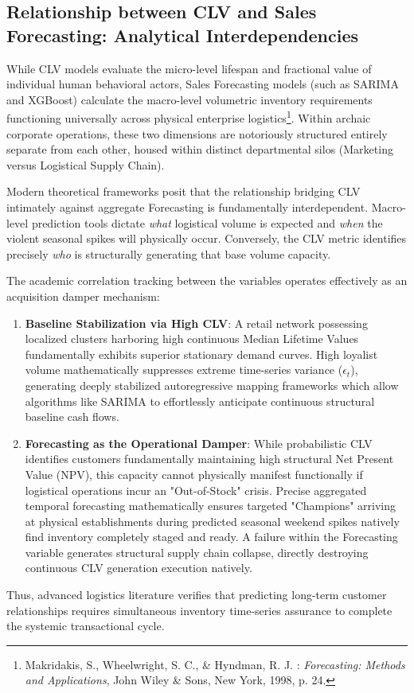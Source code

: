 \documentclass[12pt,a4paper]{report}
\begin{document}
\subsection{Relationship between CLV and Sales Forecasting: Analytical Interdependencies}
While CLV models evaluate the micro-level lifespan and fractional value of individual human behavioral actors, Sales Forecasting models (such as SARIMA and XGBoost) calculate the macro-level volumetric inventory requirements functioning universally across physical enterprise logistics\footnote{Makridakis, S., Wheelwright, S. C., \& Hyndman, R. J. : \textit{Forecasting: Methods and Applications}, John Wiley \& Sons, New York, 1998, p. 24.}. Within archaic corporate operations, these two dimensions are notoriously structured entirely separate from each other, housed within distinct departmental silos (Marketing versus Logistical Supply Chain).

Modern theoretical frameworks posit that the relationship bridging CLV intimately against aggregate Forecasting is fundamentally interdependent. Macro-level prediction tools dictate \textit{what} logistical volume is expected and \textit{when} the violent seasonal spikes will physically occur. Conversely, the CLV metric identifies precisely \textit{who} is structurally generating that base volume capacity. 

The academic correlation tracking between the variables operates effectively as an acquisition damper mechanism:
\begin{enumerate}
    \item \textbf{Baseline Stabilization via High CLV}: A retail network possessing localized clusters harboring high continuous Median Lifetime Values fundamentally exhibits superior stationary demand curves. High loyalist volume mathematically suppresses extreme time-series variance ($ \epsilon_t $), generating deeply stabilized autoregressive mapping frameworks which allow algorithms like SARIMA to effortlessly anticipate continuous structural baseline cash flows.
    \item \textbf{Forecasting as the Operational Damper}: While probabilistic CLV identifies customers fundamentally maintaining high structural Net Present Value (NPV), this capacity cannot physically manifest functionally if logistical operations incur an "Out-of-Stock" crisis. Precise aggregated temporal forecasting mathematically ensures targeted "Champions" arriving at physical establishments during predicted seasonal weekend spikes natively find inventory completely staged and ready. A failure within the Forecasting variable generates structural supply chain collapse, directly destroying continuous CLV generation execution natively.
\end{enumerate}
Thus, advanced logistics literature verifies that predicting long-term customer relationships requires simultaneous inventory time-series assurance to complete the systemic transactional cycle.
\end{document}
